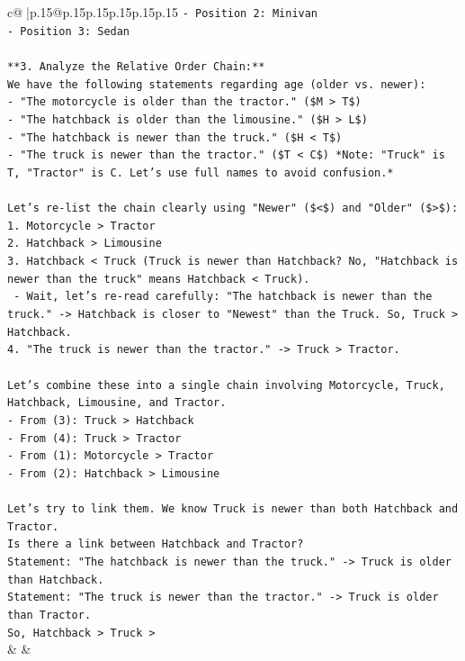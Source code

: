 \documentclass{article}
\begin{document}
{\begin{supertabular}{c@{$\;$}|p{.15\linewidth}@{}p{.15\linewidth}p{.15\linewidth}p{.15\linewidth}p{.15\linewidth}p{.15\linewidth}}
{{{\texttt{{-} Position 2: Minivan} \\
\texttt{{-} Position 3: Sedan} \\
\\ 
\texttt{**3. Analyze the Relative Order Chain:**} \\
\texttt{We have the following statements regarding age (older vs. newer):} \\
\texttt{{-} "The motorcycle is older than the tractor." (\$M > T\$)} \\
\texttt{{-} "The hatchback is older than the limousine." (\$H > L\$)} \\
\texttt{{-} "The hatchback is newer than the truck." (\$H < T\$)} \\
\texttt{{-} "The truck is newer than the tractor." (\$T < C\$) *Note: "Truck" is T, "Tractor" is C. Let's use full names to avoid confusion.*} \\
\\ 
\texttt{Let's re{-}list the chain clearly using "Newer" (\$<\$) and "Older" (\$>\$):} \\
\texttt{1. Motorcycle > Tractor} \\
\texttt{2. Hatchback > Limousine} \\
\texttt{3. Hatchback < Truck (Truck is newer than Hatchback? No, "Hatchback is newer than the truck" means Hatchback < Truck).} \\
\texttt{   {-} Wait, let's re{-}read carefully: "The hatchback is newer than the truck." {-}> Hatchback is closer to "Newest" than the Truck. So, Truck > Hatchback.} \\
\texttt{4. "The truck is newer than the tractor." {-}> Truck > Tractor.} \\
\\ 
\texttt{Let's combine these into a single chain involving Motorcycle, Truck, Hatchback, Limousine, and Tractor.} \\
\texttt{{-} From (3): Truck > Hatchback} \\
\texttt{{-} From (4): Truck > Tractor} \\
\texttt{{-} From (1): Motorcycle > Tractor} \\
\texttt{{-} From (2): Hatchback > Limousine} \\
\\ 
\texttt{Let's try to link them. We know Truck is newer than both Hatchback and Tractor.} \\
\texttt{Is there a link between Hatchback and Tractor?} \\
\texttt{Statement: "The hatchback is newer than the truck." {-}> Truck is older than Hatchback.} \\
\texttt{Statement: "The truck is newer than the tractor." {-}> Truck is older than Tractor.} \\
\texttt{So, Hatchback > Truck >} \\
            }
        }
    }
    & & \\ \\


\end{supertabular}}
\end{document}
